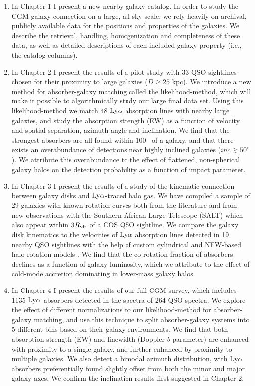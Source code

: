 \begin{enumerate}

\item{In Chapter 1 I present a new nearby galaxy catalog. In order to study the CGM-galaxy connection on a large, all-sky scale, we rely heavily on archival, publicly available data for the positions and properties of the galaxies. We describe the retrieval, handling, homogenization and completeness of these data, as well as detailed descriptions of each included galaxy property (i.e., the catalog columns).}

 
\item{In Chapter 2 I present the results of a pilot study with 33 QSO sightlines chosen for their proximity to large galaxies ($D \ge 25$ kpc). We introduce a new method for absorber-galaxy matching called the likelihood-method, which will make it possible to algorithmically study our large final data set. Using this likelihood-method we match 48 $\rm Ly\alpha$ absorption lines with nearby large galaxies, and study the absorption strength (EW) as a function of velocity and spatial separation, azimuth angle and inclination. We find that the strongest absorbers are all found within $100$ \kms~of a galaxy, and that there exists an overabundance of detections near highly inclined galaxies ($inc \gtrsim 50^{\circ}$). We attribute this overabundance to the effect of flattened, non-spherical galaxy halos on the detection probability as a function of impact parameter.}


\item{In Chapter 3 I present the results of a study of the kinematic connection between galaxy disks and $\rm Ly\alpha$-traced halo gas. We have compiled a sample of 29 galaxies with known rotation curves both from the literature and from new observations with the Southern African Large Telescope (SALT) which also appear within $3 R_{\rm vir}$ of a COS QSO sightline. We compare the galaxy disk kinematics to the velocities of $\rm Ly\alpha$ absorption lines detected in 19 nearby QSO sightlines with the help of custom cylindrical and NFW-based halo rotation models \citep{navarro1996, navarro1997}. We find that the co-rotation fraction of absorbers declines as a function of galaxy luminosity, which we attribute to the effect of cold-mode accretion dominating in lower-mass galaxy halos.}


\item{In Chapter 4 I present the results of our full CGM survey, which includes 1135 $\rm Ly\alpha$ absorbers detected in the spectra of 264 QSO spectra. We explore the effect of different normalizations to our likelihood-method for absorber-galaxy matching, and use this technique to split absorber-galaxy systems into 5 different bins based on their galaxy environments. We find that both absorption strength (EW) and linewidth (Doppler $b$-parameter) are enhanced with proximity to a single galaxy, and further enhanced by proximity to multiple galaxies. We also detect a bimodal azimuth distribution, with $\rm Ly\alpha$ absorbers preferentially found slightly offset from both the minor and major galaxy axes. We confirm the inclination results first suggested in Chapter 2.}


\end{enumerate}
